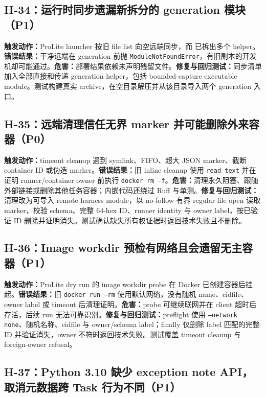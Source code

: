 \documentclass[11pt,a4paper,fontset=fandol]{ctexart}
\newcommand{\code}[1]{\texttt{#1}}
\begin{document}
\subsection{H-34：运行时同步遗漏新拆分的 generation 模块（P1）}

\textbf{触发动作：}ProLite launcher 按旧 file list 向空远端同步，而  已拆出多个 helper。\textbf{错误结果：}干净远端在 generation 前抛 \code{ModuleNotFoundError}，有旧副本的开发机却可能通过。\textbf{危害：}部署结果依赖未声明残留文件。\textbf{修复与回归测试：}同步清单加入全部直接和传递 generation helper，包括 bounded-capture executable module。测试构建真实 archive，在空目录解压并从该目录导入两个 generation 入口。

\subsection{H-35：远端清理信任无界 marker 并可能删除外来容器（P0）}

\textbf{触发动作：}timeout cleanup 遇到 symlink、FIFO、超大 JSON marker、截断 container ID 或伪造 marker。\textbf{错误结果：}旧 inline cleanup 使用 \code{read\_text} 并在证明 runner/container owner 前执行 \code{docker rm -f}。\textbf{危害：}清理永久阻塞、跟随外部链接或删除其他任务容器；内嵌代码还绕过 Ruff 与单测。\textbf{修复与回归测试：}清理改为可导入 remote harness module，以 no-follow 有界 regular-file open 读取 marker，校验 schema、完整 64-hex ID、runner identity 与 owner label，按已验证 ID 删除并证明消失。测试确认缺失所有权证据时返回技术失败且不删除。

\subsection{H-36：Image workdir 预检有网络且会遗留无主容器（P1）}

\textbf{触发动作：}ProLite dry run 的 image workdir probe 在 Docker 已创建容器后挂起。\textbf{错误结果：}旧 \code{docker run --rm} 使用默认网络，没有随机 name、cidfile、owner label 或 timeout 后清理证明。\textbf{危害：}probe 可继续联网并在 client 超时后存活，后续 run 无法可靠识别。\textbf{修复与回归测试：}preflight 使用 \code{--network none}、随机名称、cidfile 与 owner/schema label；finally 仅删除 label 匹配的完整 ID 并验证消失，owner 不符时返回技术失败。测试覆盖 timeout cleanup 与 foreign-owner refusal。

\subsection{H-37：Python 3.10 缺少 exception note API，取消元数据跨 Task 行为不同（P1）}
\end{document}
